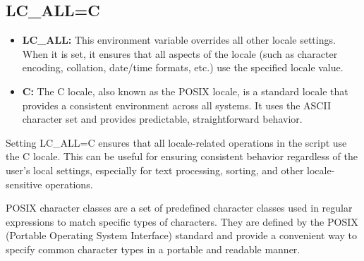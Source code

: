 \documentclass{report}
\begin{document}
    
    \bigbreak \noindent 
    \subsection{LC\_ALL=C}
    \begin{itemize}
        \item \textbf{LC\_ALL:} This environment variable overrides all other locale settings. When it is set, it ensures that all aspects of the locale (such as character encoding, collation, date/time formats, etc.) use the specified locale value.
        \item \textbf{C:} The C locale, also known as the POSIX locale, is a standard locale that provides a consistent environment across all systems. It uses the ASCII character set and provides predictable, straightforward behavior.
    \end{itemize}
    \bigbreak \noindent 
    Setting LC\_ALL=C ensures that all locale-related operations in the script use the C locale. This can be useful for ensuring consistent behavior regardless of the user's local settings, especially for text processing, sorting, and other locale-sensitive operations.

    \pagebreak 
    \bigbreak \noindent 
    \begin{concept}
        POSIX character classes are a set of predefined character classes used in regular expressions to match specific types of characters. They are defined by the POSIX (Portable Operating System Interface) standard and provide a convenient way to specify common character types in a portable and readable manner.
    \end{concept}
    \bigbreak \noindent 
\end{document}
